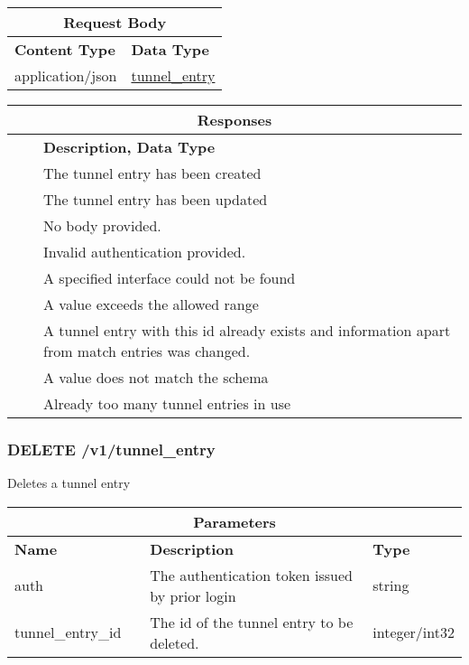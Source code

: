 \begin{longtable}{ |p{3cm}|p{7.88cm}| }
\hline
\multicolumn{2}{|c|}{\textbf{Request Body}} \\
 \hline
\textbf{Content Type} & \textbf{Data Type} \\
\hline
application/json & \hyperref[vpn_gateway_tunnel_entry]{tunnel\_entry} \\
 \hline
\end{longtable}

\begin{longtable}{ |p{1.0cm}|p{3cm}|p{6.44cm}| }
\hline
\multicolumn{3}{|c|}{\textbf{Responses}} \\
 \hline
\centering{\textbf{Code}} & \centering{\textbf{Content Type}} & \textbf{Description, Data Type} \\
\hline
\centering{201} & \centering{text/plain} & The tunnel entry has been created \\
 \hline
\endhead
\centering{202} & \centering{text/plain} & The tunnel entry has been updated \\
 \hline
\centering{400} & \centering{text/plain} & No body provided. \\
 \hline
\centering{403} & \centering{text/plain} & Invalid authentication provided. \\
 \hline
\centering{404} & \centering{text/plain} & A specified interface could not be found \\
 \hline
\centering{406} & \centering{text/plain} & A value exceeds the allowed range \\
 \hline
\centering{409} & \centering{text/plain} & A tunnel entry with this id already exists and information apart from match entries was changed. \\
 \hline
\centering{412} & \centering{text/plain} & A value does not match the schema \\
 \hline
\centering{507} & \centering{text/plain} & Already too many tunnel entries in use \\
 \hline
\end{longtable}

\newpage
\subsubsection{DELETE /v1/tunnel\_entry}
Deletes a tunnel entry
\begin{longtable}{ |p{2.5cm}|p{1.5cm}|p{4cm}|p{2cm}| }
\hline
\multicolumn{4}{|c|}{\textbf{Parameters}} \\
 \hline
\textbf{Name} & \centering{\textbf{Location}} & \textbf{Description} & \textbf{Type} \\
\hline
auth & \centering{QUERY} & The authentication token issued by prior login & string \\
 \hline
tunnel\_entry\_id & \centering{QUERY} & The id of the tunnel entry to be deleted. & integer/int32 \\
 \hline
\endhead \end{longtable}

